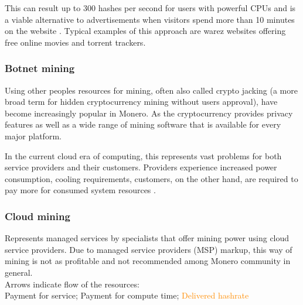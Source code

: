 \documentclass[
  printed, %
  table,   %
  lof,     %
  lot,     %
           oneside, color
]{fithesis3}
\begin{document}
This can result up to 300 hashes per second for users with powerful CPUs and is a viable alternative to advertisements when visitors spend more than 10 minutes on the website \cite{papadopoulos2018truth}. Typical examples of this approach are warez websites offering free online movies and torrent trackers.
\subsubsection{Botnet mining}
\label{cha:botnetmining}
Using other peoples resources for mining, often also called crypto jacking (a more broad term for hidden cryptocurrency mining without users approval), have become increasingly popular in Monero. As the cryptocurrency provides privacy features as well as a wide range of mining software that is available for every major platform.

In the current cloud era of computing, this represents vast problems for both service providers and their customers. Providers experience increased power consumption, cooling requirements, customers, on the other hand, are required to pay more for consumed system resources \cite{tahir2017mining}.

\subsubsection{Cloud mining}
\label{cha:cloudmining}
Represents managed services by specialists that offer mining power using cloud service providers. Due to managed service providers (MSP) markup, this way of mining is not as profitable and not recommended among Monero community in general. \\Arrows indicate flow of the resources:\\ \textcolor{ao(english)} {Payment for service}; \textcolor{azure(colorwheel)}{Payment for compute time}; \textcolor{darkorange}{Delivered hashrate}
\end{document}
